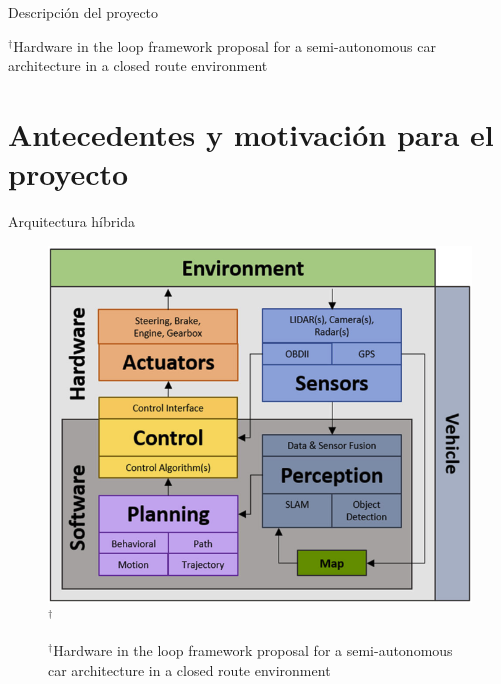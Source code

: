\documentclass[
	12pt, %
	aspectratio=169, %
]{beamer}
\begin{document}
\begin{frame}{Descripción del proyecto}
\begin{minipage}{0.5\textwidth}
{      \rule{0in}{1.2em}$^\dag$\scriptsize Hardware in the loop framework proposal for a semi-autonomous car architecture in a closed route environment \cite{CurielRamirez2019}
    }
  \end{minipage}
\end{frame}

\section{Antecedentes y motivación para el proyecto}
\begin{frame}{Arquitectura híbrida}
  \begin{figure}
    \centering
    \includegraphics[scale=0.30]{control_autonomo2}$^\dag$\\
    \rule{0in}{1.2em}$^\dag$\scriptsize Hardware in the loop framework proposal for a semi-autonomous car architecture in a closed route environment \cite{CurielRamirez2019}\\
  \end{figure}
\end{frame}
\end{document}
